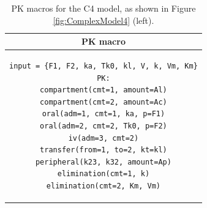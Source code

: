 \begin{table}[ht!]
\setlength{\tabcolsep}{15pt}
\begin{center}
\begin{tabular}{c}
  \hline \hline
PK macro  \\[-.25ex]
  \hline
\lstset{language=NONMEMdataSet}
\begin{lstlisting}
input = {F1, F2, ka, Tk0, kl, V, k, Vm, Km}
PK:
compartment(cmt=1, amount=Al)
compartment(cmt=2, amount=Ac)
oral(adm=1, cmt=1, ka, p=F1)
oral(adm=2, cmt=2, Tk0, p=F2)
iv(adm=3, cmt=2)
transfer(from=1, to=2, kt=kl)
peripheral(k23, k32, amount=Ap)
elimination(cmt=1, k)
elimination(cmt=2, Km, Vm)
\end{lstlisting}
\\
  \hline
\end{tabular}
\caption{PK macros  for the C4 model, as shown in Figure \ref{fig:ComplexModel4} (left).}
\label{tab:C4Table}
\end{center}
\end{table}


